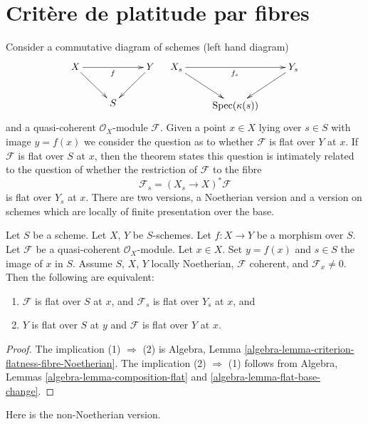 \section{Crit\`ere de platitude par fibres}
\label{section-criterion-flat-fibres}

\noindent
Consider a commutative diagram of schemes (left hand diagram)
$$
\xymatrix{
X \ar[rr]_f \ar[dr] & & Y \ar[dl] \\
& S
}
\quad
\xymatrix{
X_s \ar[rr]_{f_s} \ar[rd] & & Y_s \ar[dl] \\
& \text{Spec}(\kappa(s))
}
$$
and a quasi-coherent $\mathcal{O}_X$-module $\mathcal{F}$.
Given a point $x \in X$ lying over $s \in S$ with image $y = f(x)$
we consider the question as to whether $\mathcal{F}$ is flat
over $Y$ at $x$. If $\mathcal{F}$ is flat over $S$ at $x$, then
the theorem states this question is intimately related to the
question of whether the restriction of $\mathcal{F}$ to the fibre
$$
\mathcal{F}_s = (X_s \to X)^*\mathcal{F}
$$
is flat over $Y_s$ at $x$. There are two versions, a Noetherian
version and a version on schemes which are locally of finite
presentation over the base.

\begin{theorem}
\label{theorem-criterion-flatness-fibre-Noetherian}
Let $S$ be a scheme. Let $X$, $Y$ be $S$-schemes.
Let $f : X \to Y$ be a morphism over $S$.
Let $\mathcal{F}$ be a quasi-coherent $\mathcal{O}_X$-module.
Let $x \in X$. Set $y = f(x)$ and $s \in S$ the image of $x$ in $S$.
Assume $S$, $X$, $Y$ locally Noetherian,
$\mathcal{F}$ coherent, and $\mathcal{F}_x \not = 0$.
Then the following are equivalent:
\begin{enumerate}
\item $\mathcal{F}$ is flat over $S$ at $x$, and
$\mathcal{F}_s$ is flat over $Y_s$ at $x$, and
\item $Y$ is flat over $S$ at $y$ and $\mathcal{F}$ is
flat over $Y$ at $x$.
\end{enumerate}
\end{theorem}

\begin{proof}
The implication (1) $\Rightarrow$ (2) is
Algebra, Lemma \ref{algebra-lemma-criterion-flatness-fibre-Noetherian}.
The implication (2) $\Rightarrow$ (1) follows from
Algebra, Lemmas \ref{algebra-lemma-composition-flat}
and \ref{algebra-lemma-flat-base-change}.
\end{proof}

\noindent
Here is the non-Noetherian version.

